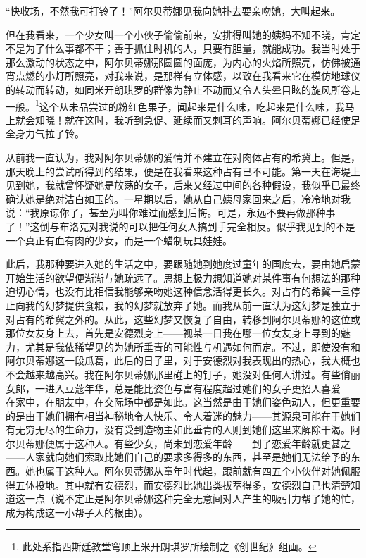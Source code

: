 \par “快收场，不然我可打铃了！”阿尔贝蒂娜见我向她扑去要亲吻她，大叫起来。
\par 但在我看来，一个少女叫一个小伙子偷偷前来，安排得叫她的姨妈不知不晓，肯定不是为了什么事都不干；善于抓住时机的人，只要有胆量，就能成功。我当时处于那么激动的状态之中，阿尔贝蒂娜那圆圆的面庞，为内心的火焰所照亮，仿佛被通宵点燃的小灯所照亮，对我来说，是那样有立体感，以致在我看来它在模仿地球仪的转动而转动，如同米开朗琪罗的群像为静止不动而又令人头晕目眩的旋风所卷走一般。\footnote{此处系指西斯廷教堂穹顶上米开朗琪罗所绘制之《创世纪》组画。}这个从未品尝过的粉红色果子，闻起来是什么味，吃起来是什么味，我马上就会知晓！就在这时，我听到急促、延续而又刺耳的声响。阿尔贝蒂娜已经使足全身力气拉了铃。
\par 从前我一直认为，我对阿尔贝蒂娜的爱情并不建立在对肉体占有的希冀上。但是，那天晚上的尝试所得到的结果，便是在我看来这种占有已不可能。第一天在海堤上见到她，我就曾怀疑她是放荡的女子，后来又经过中间的各种假设，我似乎已最终确认她是绝对洁白如玉的。一星期以后，她从自己姨母家回来之后，冷冷地对我说：“我原谅你了，甚至为叫你难过而感到后悔。可是，永远不要再做那种事了！”这倒与布洛克对我说的可以把任何女人搞到手完全相反。似乎我见到的不是一个真正有血有肉的少女，而是一个蜡制玩具娃娃。
\par 此后，我那种要进入她的生活之中，要跟随她到她度过童年的国度去，要由她启蒙开始生活的欲望便渐渐与她疏远了。思想上极力想知道她对某件事有何想法的那种迫切心情，也没有比相信我能够亲吻她这种信念活得更长久。对占有的希冀一旦停止向我的幻梦提供食粮，我的幻梦就放弃了她。而我从前一直认为这幻梦是独立于对占有的希冀之外的。从此，这些幻梦又恢复了自由，转移到阿尔贝蒂娜的这位或那位女友身上去，首先是安德烈身上——视某一日我在哪一位女友身上寻到的魅力，尤其是我依稀望见的为她所垂青的可能性与机遇如何而定。不过，即使没有和阿尔贝蒂娜这一段瓜葛，此后的日子里，对于安德烈对我表现出的热心，我大概也不会越来越高兴。我在阿尔贝蒂娜那里碰上的钉子，她没对任何人讲过。有些俏丽女郎，一进入豆蔻年华，总是能比姿色与富有程度超过她们的女子更招人喜爱——在家中，在朋友中，在交际场中都是如此。这当然是由于她们姿色动人，但更重要的是由于她们拥有相当神秘地令人快乐、令人着迷的魅力——其源泉可能在于她们有无穷无尽的生命力，没有受到造物主如此垂青的人则到她们这里来解除干渴。阿尔贝蒂娜便属于这种人。有些少女，尚未到恋爱年龄——到了恋爱年龄就更甚之——人家就向她们索取比她们自己的要求多得多的东西，甚至是她们无法给予的东西。她也属于这种人。阿尔贝蒂娜从童年时代起，跟前就有四五个小伙伴对她佩服得五体投地。其中就有安德烈，而安德烈比她出类拔萃得多，安德烈自己也清楚知道这一点（说不定正是阿尔贝蒂娜这种完全无意间对人产生的吸引力帮了她的忙，成为构成这一小帮子人的根由）。
